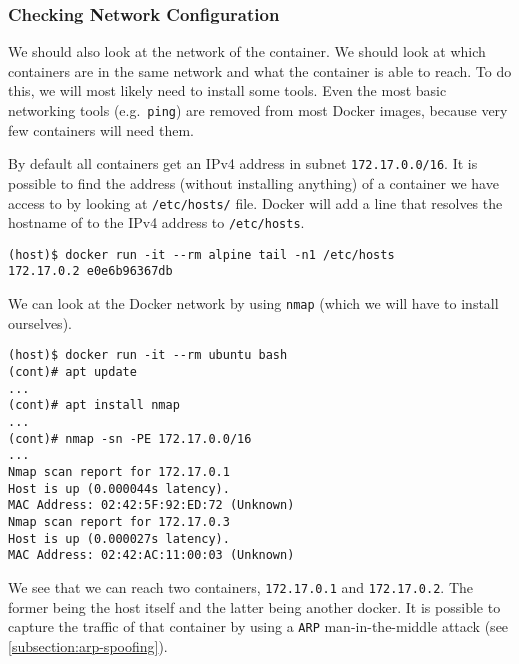 \subsubsection{Checking Network Configuration}\label{subsubsection:network-scan}
We should also look at the network of the container. We should look at which containers are in the same network and what the container is able to reach. To do this, we will most likely need to install some tools. Even the most basic networking tools (e.g.\ \lstinline{ping}) are removed from most Docker images, because very few containers will need them.

By default all containers get an IPv4 address in subnet \lstinline{172.17.0.0/16}. It is possible to find the address (without installing anything) of a container we have access to by looking at \lstinline{/etc/hosts/} file. Docker will add a line that resolves the hostname of to the IPv4 address to \lstinline{/etc/hosts}.

\begin{lstlisting}[caption={Last line of \lstinline{/etc/hosts} in Docker.},captionpos=b]
(host)$ docker run -it --rm alpine tail -n1 /etc/hosts
172.17.0.2 e0e6b96367db
\end{lstlisting}


We can look at the Docker network by using \lstinline{nmap} (which we will have to install ourselves).
\begin{lstlisting}[caption={\lstinline{nmap} scan inside container.},captionpos=b]
(host)$ docker run -it --rm ubuntu bash
(cont)# apt update
...
(cont)# apt install nmap
...
(cont)# nmap -sn -PE 172.17.0.0/16
...
Nmap scan report for 172.17.0.1
Host is up (0.000044s latency).
MAC Address: 02:42:5F:92:ED:72 (Unknown)
Nmap scan report for 172.17.0.3
Host is up (0.000027s latency).
MAC Address: 02:42:AC:11:00:03 (Unknown)
\end{lstlisting}

We see that we can reach two containers, \lstinline{172.17.0.1} and \lstinline{172.17.0.2}. The former being the host itself and the latter being another docker. It is possible to capture the traffic of that container by using a \lstinline{ARP} man-in-the-middle attack (see \autoref{subsection:arp-spoofing}).
